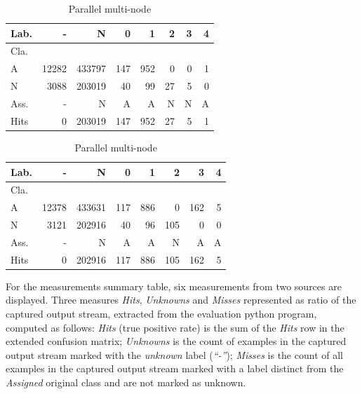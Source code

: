 \begin{table}[htb]
\vspace{3ex}

\begin{subtable}[h]{0.48\linewidth}
{\scriptsize
\setlength\tabcolsep{0.35em}
\begin{center}
\caption{Parallel single-node}
\label{tab:single-node-matrix}
\begin{tabular}{l|r|r|r|r|r|r|r}
  Lab. &      - &       N &    0 &    1 &   2 &  3 &  4 \\\hline
  Cla.  &        &         &      &      &     &    &    \\\hline
  \hline
  A        &  12282 &  433797 &  147 &  952 &   0 &  0 &  1 \\\hline
  N        &   3088 &  203019 &   40 &   99 &  27 &  5 &  0 \\\hline
  \hline
  Ass. &      - &       N &    A &    A &   N &  N &  A \\\hline
  Hits     &      0 &  203019 &  147 &  952 &  27 &  5 &  1 
\end{tabular}
\end{center}
}
\end{subtable}
% 
% 
\begin{subtable}[h]{0.48\linewidth}
{\scriptsize
\setlength\tabcolsep{0.35em}
\begin{center}
\caption{Parallel multi-node}
\label{tab:multi-node-matrix}
\begin{tabular}{l|r|r|r|r|r|r|r}
  Lab.   &      - &       N &    0 &    1 &    2 &    3 &  4 \\\hline
  Cla.   &        &         &      &      &      &      &    \\\hline
  \hline
  A      &  12378 &  433631 &  117 &  886 &    0 &  162 &  5 \\\hline
  N      &   3121 &  202916 &   40 &   96 &  105 &    0 &  0 \\\hline
  \hline
  Ass.   &      - &       N &    A &    A &    N &    A &  A \\\hline
  Hits   &      0 &  202916 &  117 &  886 &  105 &  162 &  5 
\end{tabular}
\end{center}
}
\end{subtable}

\end{table}

For the measurements summary table, six measurements from two sources are displayed. Three
measures \emph{Hits}, \emph{Unknowns} and \emph{Misses} represented as ratio of
the captured output stream, extracted from the evaluation python program,
computed as follows:
\emph{Hits} (true positive rate) is the sum of the \emph{Hits} row in the
extended confusion matrix;
\emph{Unknowns} is the count of examples in the captured output stream marked
with the \emph{unknown} label (\emph{``-''});
\emph{Misses} is the count of all examples in the captured output stream marked
with a label distinct from the \emph{Assigned} original class and are not marked
as unknown.

